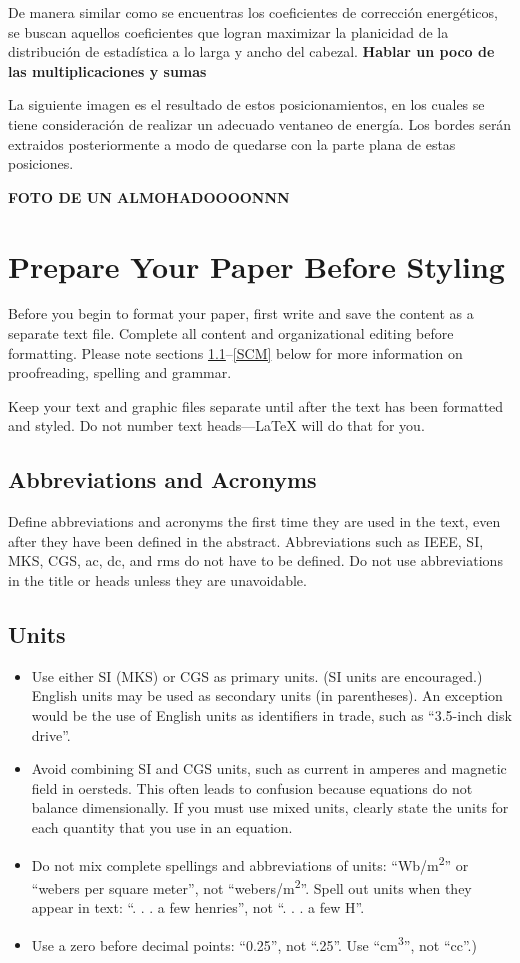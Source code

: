 \documentclass[conference]{IEEEtran}
\begin{document}
De manera similar como se encuentras los coeficientes de corrección energéticos, se buscan aquellos coeficientes que logran maximizar la planicidad de la distribución de estadística a lo larga y ancho del cabezal. 
\textbf{Hablar un poco de las multiplicaciones y sumas}

La siguiente imagen es el resultado de estos posicionamientos, en los cuales se tiene consideración de realizar un adecuado ventaneo de energía. Los bordes serán extraidos posteriormente a modo de quedarse con la parte plana de estas posiciones.

\textbf{FOTO DE UN ALMOHADOOOONNN}


\clearpage


\section{Prepare Your Paper Before Styling}
Before you begin to format your paper, first write and save the content as a 
separate text file. Complete all content and organizational editing before 
formatting. Please note sections \ref{AA}--\ref{SCM} below for more information on 
proofreading, spelling and grammar.

Keep your text and graphic files separate until after the text has been 
formatted and styled. Do not number text heads---{\LaTeX} will do that 
for you.

\subsection{Abbreviations and Acronyms}\label{AA}
Define abbreviations and acronyms the first time they are used in the text, 
even after they have been defined in the abstract. Abbreviations such as 
IEEE, SI, MKS, CGS, ac, dc, and rms do not have to be defined. Do not use 
abbreviations in the title or heads unless they are unavoidable.

\subsection{Units}
\begin{itemize}
\item Use either SI (MKS) or CGS as primary units. (SI units are encouraged.) English units may be used as secondary units (in parentheses). An exception would be the use of English units as identifiers in trade, such as ``3.5-inch disk drive''.
\item Avoid combining SI and CGS units, such as current in amperes and magnetic field in oersteds. This often leads to confusion because equations do not balance dimensionally. If you must use mixed units, clearly state the units for each quantity that you use in an equation.
\item Do not mix complete spellings and abbreviations of units: ``Wb/m\textsuperscript{2}'' or ``webers per square meter'', not ``webers/m\textsuperscript{2}''. Spell out units when they appear in text: ``. . . a few henries'', not ``. . . a few H''.
\item Use a zero before decimal points: ``0.25'', not ``.25''. Use ``cm\textsuperscript{3}'', not ``cc''.)
\end{itemize}
\end{document}
